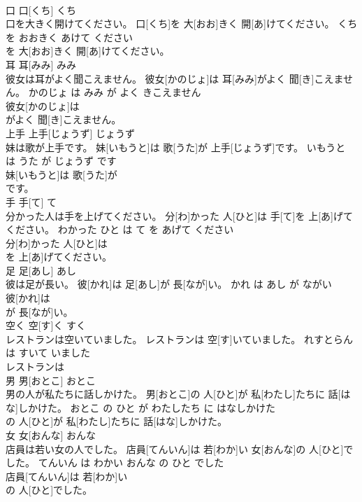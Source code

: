 \documentclass[8pt]{extreport}
\begin{document}
\begin{CJK}{UTF8}{min}
\\	口	口[くち]	くち	
\\	口を大きく開けてください。	口[くち]を 大[おお]きく 開[あ]けてください。	くち を おおきく あけて ください	
\\	を 大[おお]きく 開[あ]けてください。		
\\	耳	耳[みみ]	みみ	
\\	彼女は耳がよく聞こえません。	彼女[かのじょ]は 耳[みみ]がよく 聞[き]こえません。	かのじょ は みみ が よく きこえません	
\\	彼女[かのじょ]は
\\	がよく 聞[き]こえません。		
\\	上手	上手[じょうず]	じょうず	
\\	妹は歌が上手です。	妹[いもうと]は 歌[うた]が 上手[じょうず]です。	いもうと は うた が じょうず です	
\\	妹[いもうと]は 歌[うた]が
\\	です。		
\\	手	手[て]	て	
\\	分かった人は手を上げてください。	分[わ]かった 人[ひと]は 手[て]を 上[あ]げてください。	わかった ひと は て を あげて ください	
\\	分[わ]かった 人[ひと]は
\\	を 上[あ]げてください。		
\\	足	足[あし]	あし	
\\	彼は足が長い。	彼[かれ]は 足[あし]が 長[なが]い。	かれ は あし が ながい	
\\	彼[かれ]は
\\	が 長[なが]い。		
\\	空く	空[す]く	すく	
\\	レストランは空いていました。	レストランは 空[す]いていました。	れすとらん は すいて いました	
\\	レストランは
\\	男	男[おとこ]	おとこ	
\\	男の人が私たちに話しかけた。	男[おとこ]の 人[ひと]が 私[わたし]たちに 話[はな]しかけた。	おとこ の ひと が わたしたち に はなしかけた	
\\	の 人[ひと]が 私[わたし]たちに 話[はな]しかけた。		
\\	女	女[おんな]	おんな	
\\	店員は若い女の人でした。	店員[てんいん]は 若[わか]い 女[おんな]の 人[ひと]でした。	てんいん は わかい おんな の ひと でした	
\\	店員[てんいん]は 若[わか]い
\\	の 人[ひと]でした。		

\end{CJK}
\end{document}
